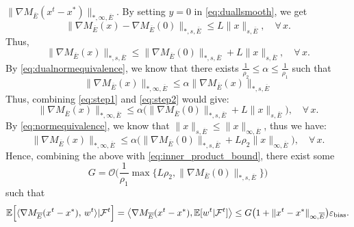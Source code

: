 \(\|\nabla M_{\overline{E}}(x^t - x^*)\|_{*,\infty,\overline{E}}\). By setting 
 $y=0$ in \eqref{eq:duallsmooth}, we get
\begin{equation}  
  \| \nabla M_{\overline{E}}(x) - \nabla M_{\overline{E}}(0)\|_{*,s,\overline{E}} \leq 
   L\|  x \|_{s,\overline{E}},
  \quad
  \forall\,x.
\end{equation}
Thus,
\begin{equation} \label{eq:step1}
     \| \nabla M_{\overline{E}}(x) \|_{*,s,\overline{E}} \leq  \| \nabla M_{\overline{E}}(0) \|_{*,s,\overline{E}} +
   L\| x \|_{s,\overline{E}},
  \quad
  \forall\,x.
\end{equation}
By \eqref{eq:dualnormequivalence}, we know that there exists $\frac{1}{\rho_2}\leq \alpha \leq \frac{1}{ \rho_1}$ such that
\begin{equation} \label{eq:step2}
    \|  \nabla M_{\overline{E}}(x) \|_{*,\infty,\overline{E}} \leq \alpha   \|  \nabla M_{\overline{E}}(x) \|_{*,s,\overline{E}} 
\end{equation}
Thus, combining \eqref{eq:step1} and \eqref{eq:step2} would give:
\begin{equation} 
     \| \nabla M_{\overline{E}}(x) \|_{*,\infty,\overline{E}} \leq  \alpha\big(\| \nabla M_{\overline{E}}(0) \|_{*,s,\overline{E}} +
   L\| x \|_{s,\overline{E}}\big),
  \quad
  \forall\,x.
\end{equation}
By \eqref{eq:normequivalence}, we know that $\| x \|_{s,\overline{E}} \leq \| x \|_{\infty,\overline{E}}$, thus we have:
\begin{equation} 
     \| \nabla M_{\overline{E}}(x) \|_{*,\infty,\overline{E}} \leq  \alpha\big(\| \nabla M_{\overline{E}}(0) \|_{*,s,\overline{E}} +
   L\rho_2\| x \|_{\infty,\overline{E}}\big),
  \quad
  \forall\,x.
\end{equation}
Hence, combining the above with \eqref{eq:inner_product_bound}, there exist some 
\begin{equation} \label{eq:G_value}
G=\mathcal{O}\big(\frac{1}{\rho_1} \max\{L\rho_2, \| \nabla M_{\overline{E}}(0) \|_{*,s,\overline{E}}\} \big)
\end{equation}
such that
\begin{equation}  \label{eq:Gepsilonbias}
  \mathbb{E}
  \Bigl[\langle 
    \nabla M_{\overline{E}}(x^t - x^*),\,w^t
  \rangle|\mathcal{F}^t\Bigr]=\bigl\langle 
    \nabla M_{\overline{E}}(x^t - x^*),
    \mathbb{E}[w^t|\mathcal{F}^t]
  \bigr\rangle\leq G
  \bigl(1 + \|x^t - x^*\|_{\infty,\overline{E}}\bigr)
  \varepsilon_{\text{bias}}.
\end{equation}
